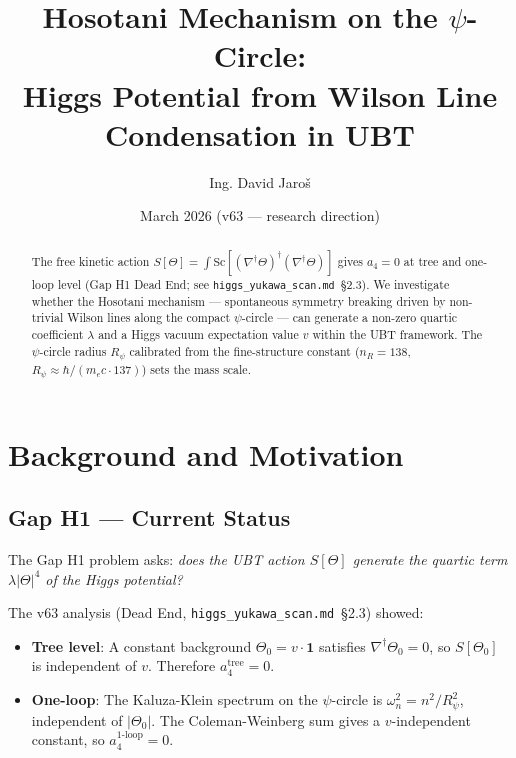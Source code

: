 \documentclass[12pt]{article}
\title{\textbf{Hosotani Mechanism on the $\psi$-Circle:\\
       Higgs Potential from Wilson Line Condensation in UBT}}
\author{Ing. David Jaroš}
\date{March 2026 (v63 — research direction)}
\theoremstyle{definition}
\theoremstyle{remark}
\begin{document}
\maketitle

\begin{abstract}
The free kinetic action $S[\Theta] = \int \text{Sc}[(\nabla^\dagger\Theta)^\dagger(\nabla^\dagger\Theta)]$
gives $a_4 = 0$ at tree and one-loop level (Gap H1 Dead End; see
\texttt{higgs\_yukawa\_scan.md}~§2.3).
We investigate whether the Hosotani mechanism — spontaneous symmetry breaking
driven by non-trivial Wilson lines along the compact $\psi$-circle — can generate
a non-zero quartic coefficient $\lambda$ and a Higgs vacuum expectation value $v$
within the UBT framework.
The $\psi$-circle radius $R_\psi$ calibrated from the fine-structure constant
($n_R = 138$, $R_\psi \approx \hbar/(m_e c \cdot 137)$) sets the mass scale.
\end{abstract}

\tableofcontents

\section{Background and Motivation}
\label{sec:background}

\subsection{Gap H1 — Current Status}

The Gap H1 problem asks: \emph{does the UBT action $S[\Theta]$ generate
the quartic term $\lambda|\Theta|^4$ of the Higgs potential?}

The v63 analysis (Dead End, \texttt{higgs\_yukawa\_scan.md}~§2.3) showed:
\begin{itemize}
  \item \textbf{Tree level}: A constant background $\Theta_0 = v \cdot \mathbf{1}$
        satisfies $\nabla^\dagger\Theta_0 = 0$, so $S[\Theta_0]$ is independent
        of $v$.  Therefore $a_4^{\text{tree}} = 0$.
  \item \textbf{One-loop}: The Kaluza-Klein spectrum on the $\psi$-circle
        is $\omega_n^2 = n^2/R_\psi^2$, independent of $|\Theta_0|$.
        The Coleman-Weinberg sum gives a $v$-independent constant, so
        $a_4^{\text{1-loop}} = 0$.
\end{itemize}
\end{document}

